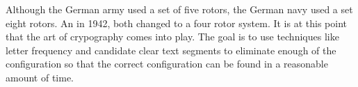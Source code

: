 Although the German army used a set of five rotors, the German navy used a set eight rotors.  An in 1942, both
changed to a four rotor system.  It is at this point that the art of crypography comes into play.  The goal is to
use techniques like letter frequency and candidate clear text segments to eliminate enough of the configuration so
that the correct configuration can be found in a reasonable amount of time.
